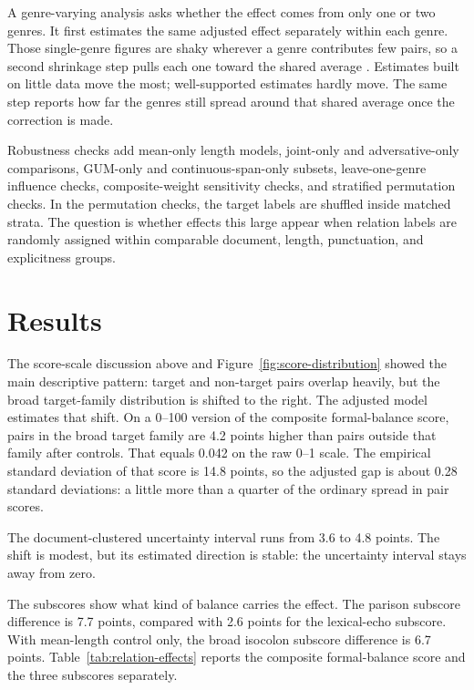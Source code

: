 \documentclass[12pt]{article}
\begin{document}
A genre-varying analysis asks whether the effect comes from only one or
two genres. It first estimates the same adjusted effect separately within
each genre. Those single-genre figures are shaky wherever a genre
contributes few pairs, so a second shrinkage step pulls each one toward the
shared average \citep{efronMorris1973SteinEmpiricalBayes}. Estimates built
on little data move the most; well-supported estimates hardly move. The
same step reports how far the genres still spread around that shared
average once the correction is made.

Robustness checks add mean-only length models, joint-only and
adversative-only comparisons, GUM-only and continuous-span-only subsets,
leave-one-genre influence checks, composite-weight sensitivity checks, and
stratified permutation checks. In the permutation checks, the target
labels are shuffled inside matched strata. The question is whether effects
this large appear when relation labels are randomly assigned within
comparable document, length, punctuation, and explicitness groups.

\section{Results}

The score-scale discussion above and Figure~\ref{fig:score-distribution}
showed the main descriptive pattern: target and non-target pairs overlap
heavily, but the broad target-family distribution is shifted to the right.
The adjusted model estimates that shift. On a 0--100 version of the
composite formal-balance score, pairs in the broad target family are 4.2
points higher than pairs outside that family after controls. That equals
0.042 on the raw 0--1 scale. The empirical standard
deviation of that score is 14.8 points, so the adjusted gap is about 0.28
standard deviations: a little more than a quarter of the ordinary spread in
pair scores.

The document-clustered uncertainty interval runs from 3.6 to 4.8 points.
The shift is modest, but its estimated direction is stable: the uncertainty
interval stays away from zero.

The subscores show what kind of balance carries the effect. The parison
subscore difference is 7.7 points, compared with 2.6 points for the
lexical-echo subscore. With mean-length control only, the broad isocolon
subscore difference is 6.7 points. Table~\ref{tab:relation-effects}
reports the composite formal-balance score and the three subscores separately.
\end{document}
